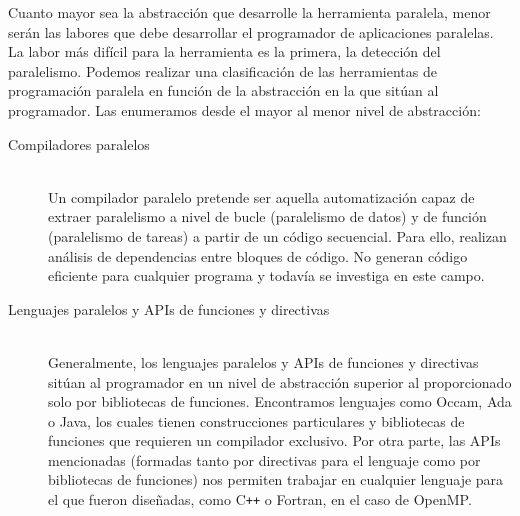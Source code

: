 Cuanto mayor sea la abstracción que desarrolle la herramienta paralela, menor serán las labores que debe desarrollar el programador de aplicaciones paralelas. La labor más difícil para la herramienta es la primera, la detección del paralelismo. Podemos realizar una clasificación de las herramientas de programación paralela en función de la abstracción en la que sitúan al programador. Las enumeramos desde el mayor al menor nivel de abstracción:
\begin{description}
    \item [Compiladores paralelos]~\\
        Un compilador paralelo pretende ser aquella automatización capaz de extraer paralelismo a nivel de bucle (paralelismo de datos) y de función (paralelismo de tareas) a partir de un código secuencial. Para ello, realizan análisis de dependencias entre bloques de código. No generan código eficiente para cualquier programa y todavía se investiga en este campo.
    \item [Lenguajes paralelos y APIs de funciones y directivas]~\\
        Generalmente, los lenguajes paralelos y APIs de funciones y directivas sitúan al programador en un nivel de abstracción superior al proporcionado solo por bibliotecas de funciones. Encontramos lenguajes como Occam, Ada o Java, los cuales tienen construcciones particulares y bibliotecas de funciones que requieren un compilador exclusivo. Por otra parte, las APIs mencionadas (formadas tanto por directivas para el lenguaje como por bibliotecas de funciones) nos permiten trabajar en cualquier lenguaje para el que fueron diseñadas, como C\verb|++| o Fortran, en el caso de OpenMP\@. 


\end{description}
